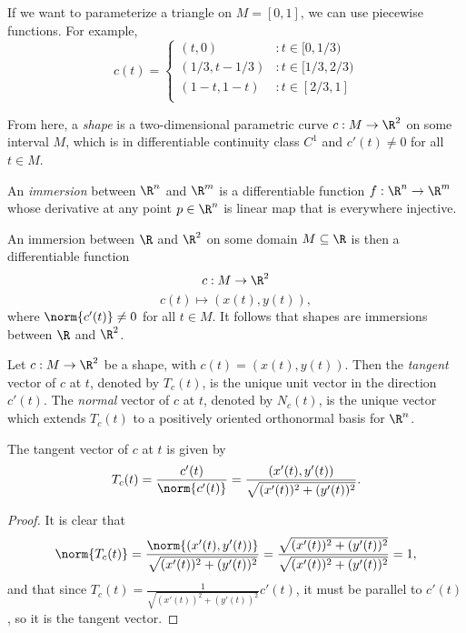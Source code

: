 \documentclass[12pt]{article}
\begin{document}
\begin{exmp}
    If we want to parameterize a triangle on $M = [0, 1]$, we can use piecewise functions. For example,
    \[c(t) = \left\{
        \begin{array}{ll}
          (t, 0) & : t \in [0, 1/3)\\
          (1/3, t - 1/3) & : t \in [1/3, 2/3)\\
          (1 - t, 1 - t) & : t \in [2/3, 1]\\
        \end{array}
      \right.
    \]
\end{exmp}

\begin{defn}
    From here, a \emph{shape} is a two-dimensional parametric curve $c: M \to \R^2$ on some interval $M$, which is in differentiable continuity class $C^1$ and $c'(t) \neq 0$ for all $t \in M$.
\end{defn}

\begin{defn}
    An \emph{immersion} between $\R^n$ and $\R^m$ is a differentiable function $f: \R^n \to \R^m$ whose derivative at any point $p \in \R^n$ is linear map that is everywhere injective.
\end{defn}

\begin{rmk}
    An immersion between $\R$ and $\R^2$ on some domain $M \subseteq \R$ is then a differentiable function \[c: M \to \R^2\] \[c(t) \mapsto (x(t), y(t)),\] where $\norm{c'(t)} \neq 0$ for all $t \in M$. It follows that shapes are immersions between $\R$ and $\R^2$.
\end{rmk}

\begin{defn}
    Let $c: M \to \R^2$ be a shape, with $c(t) = (x(t), y(t))$. Then the \emph{tangent} vector of $c$ at $t$, denoted by $T_c(t)$, is the unique unit vector in the direction $c'(t)$. The \emph{normal} vector of $c$ at $t$, denoted by $N_c(t)$, is the unique vector which extends $T_c(t)$ to a positively oriented orthonormal basis for $\R^n$.
\end{defn}

\begin{prop}
    The tangent vector of $c$ at $t$ is given by \[T_c(t) = \frac{c'(t)}{\norm{c'(t)}} = \frac{(x'(t), y'(t))}{\sqrt{(x'(t))^2 + (y'(t))^2}}.\]
\end{prop}

\begin{proof}
    It is clear that \[\norm{T_c(t)} = \frac{\norm{(x'(t), y'(t))}}{\sqrt{(x'(t))^2 + (y'(t))^2}} = \frac{\sqrt{(x'(t))^2 + (y'(t))^2}}{\sqrt{(x'(t))^2 + (y'(t))^2}} = 1,\] and that since $T_c(t) = \frac{1}{\sqrt{(x'(t))^2 + (y'(t))^2}}c'(t)$, it must be parallel to $c'(t)$, so it is the tangent vector.
\end{proof}
\end{document}
